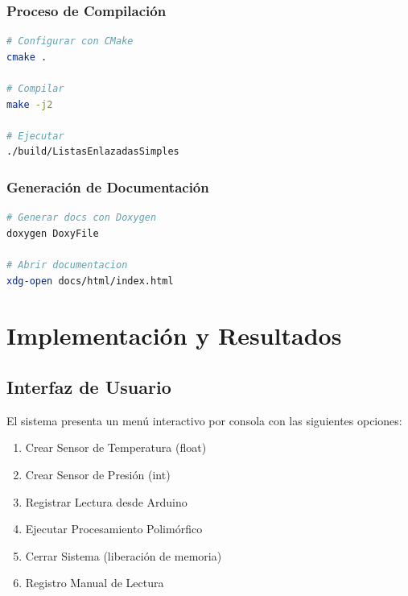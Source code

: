 \documentclass[conference]{IEEEtran}
\begin{document}
\subsubsection{Proceso de Compilación}

\vspace{0.3cm}
\begin{lstlisting}[language=bash]
# Configurar con CMake
cmake .

# Compilar
make -j2

# Ejecutar
./build/ListasEnlazadasSimples
\end{lstlisting}
\vspace{0.2cm}

\subsubsection{Generación de Documentación}

\vspace{0.3cm}
\begin{lstlisting}[language=bash]
# Generar docs con Doxygen
doxygen DoxyFile

# Abrir documentacion
xdg-open docs/html/index.html
\end{lstlisting}
\vspace{0.2cm}

\section{Implementación y Resultados}

\subsection{Interfaz de Usuario}

El sistema presenta un menú interactivo por consola con las siguientes opciones:

\begin{enumerate}
    \item Crear Sensor de Temperatura (float)
    \item Crear Sensor de Presión (int)
    \item Registrar Lectura desde Arduino
    \item Ejecutar Procesamiento Polimórfico
    \item Cerrar Sistema (liberación de memoria)
    \item Registro Manual de Lectura
\end{enumerate}
\end{document}
